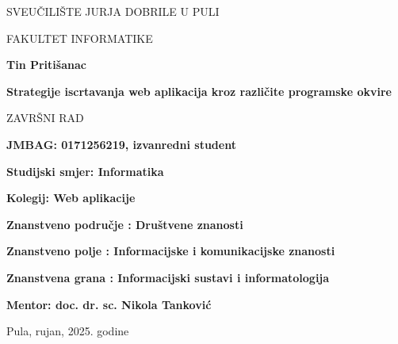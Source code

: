 \begin{center}
SVEUČILIŠTE JURJA DOBRILE U PULI 

FAKULTET INFORMATIKE

\vspace{45mm} 

\textbf{Tin Pritišanac}

\vspace{20mm} 

\textbf{Strategije iscrtavanja web aplikacija
    kroz različite programske okvire}

\vspace{5mm}
ZAVRŠNI RAD

\end{center}

\vspace{45mm}

\textbf{JMBAG: 0171256219, izvanredni student}

\textbf{Studijski smjer: Informatika}
\bigskip

\textbf{Kolegij: \textbf{Web aplikacije} }

\textbf{Znanstveno područje : Društvene znanosti}

\textbf{Znanstveno polje : Informacijske i komunikacijske znanosti}

\textbf{Znanstvena grana : Informacijski sustavi i informatologija}
\bigskip

\textbf{Mentor: doc. dr. sc. Nikola Tanković}

\vfill

\begin{center}

Pula, rujan, 2025. godine

\end{center}